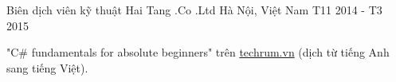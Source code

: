 

\begin{cventries}

  \cventry
    {Biên dịch viên kỹ thuật} %
    {Hai Tang .Co .Ltd} %
    {Hà Nội, Việt Nam} %
    {T11 2014 - T3 2015} %
    {
      \begin{cvitems} %
        \item {"C\# fundamentals for absolute beginners" trên \href{https://techrum.vn}{techrum.vn} (dịch từ tiếng Anh sang tiếng Việt).}
      \end{cvitems}
    }

\end{cventries}
